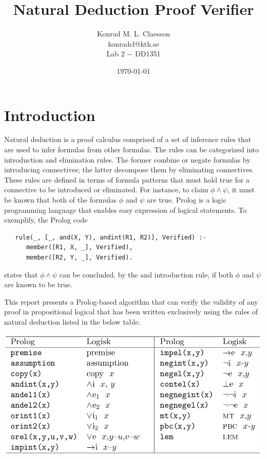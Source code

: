 \documentclass[a4paper, 11pt]{article}
\title{Natural Deduction Proof Verifier}
\author{Konrad M. L. Claesson\\ konradcl@kth.se\\ 
Lab 2 $-$ DD1351}
\date{\today}
\begin{document}
   \maketitle

   \section{Introduction}
   Natural deduction is a proof calculus comprised of a set of
   inference rules that are used to infer formulas from other
   formulas. The rules can be categorized into introduction
   and elimination rules. The former combine or negate
   formulas by introducing connectives; the latter decompose
   them by eliminating connectives. These rules are defined in
   terms of formula patterns that must hold true for a 
   connective to be introduced or eliminated. For instance, to
   claim $\phi \wedge \psi$, it must be known that
   both of the formulas $\phi$ and $\psi$ are true. Prolog is
   a logic programming language that enables easy expression 
   of logical statements. To exemplify, the Prolog code
   
   \begin{verbatim}
   rule(_, [_, and(X, Y), andint(R1, R2)], Verified) :-
      member([R1, X, _], Verified),
      member([R2, Y, _], Verified).
   \end{verbatim}
   
   states that $\phi \wedge \psi$ can be concluded, by the and
   introduction rule, if both $\phi$ and $\psi$ are known to
   be true. 
   \bigbreak

   This report presents a Prolog-based algorithm that can
   verify the validity of any proof in propositional logical 
   that has been written exclusively using the rules of
   natural deduction listed in the below table.

   \begin{center}
      \includegraphics[scale=0.325]{inference-rules}
   \end{center}
\end{document}
